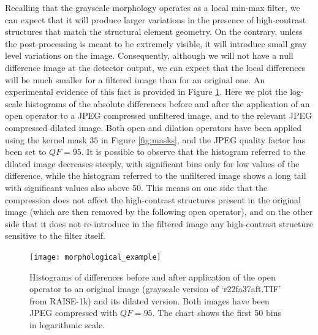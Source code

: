 \documentclass{ieeeaccess}
\begin{document}
Recalling that the grayscale morphology operates as a local min-max filter, we can expect that it will produce larger variations in the presence of high-contrast structures that match the structural element geometry. On the contrary, unless the post-processing is meant to be extremely visible, it will introduce small gray level variations on the image. Consequently, although we will not have a null difference image at the detector output, we can expect that the local differences will be much smaller for a filtered image than for an original one. An experimental evidence of this fact is provided in Figure \ref{fig:hist_ero}. Here we plot the log-scale histograms of the absolute differences before and after the application of an open operator to a JPEG compressed unfiltered image, and to the relevant JPEG compressed dilated image. Both open and dilation operators have been applied using the kernel mask $35$ in Figure \ref{fig:masks}, and the JPEG quality factor has been set to $QF=95$. It is possible to observe that the histogram referred to the dilated image decreases steeply, with significant bins only for low values of the difference, while the histogram referred to the unfiltered image shows a long tail with significant values also above 50. This means on one side that the compression does not affect the high-contrast structures present in the original image (which are then removed by the following open operator), and on the other side that it does not re-introduce in the filtered image any high-contrast structure sensitive to the filter itself.

\label{subsec:compr_img}
\begin{figure}[!ht]%
	\centering
	\texttt{[image: morphological\_example]}
	\caption{Histograms of differences before and after application of the open operator to an original image (grayscale version of `r22fa37aft.TIF' from RAISE-1k) and its dilated version. Both images have been JPEG compressed with $QF = 95$. The chart shows the first 50 bins in logarithmic scale. }
	\label{fig:hist_ero}
\end{figure}
\end{document}
